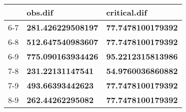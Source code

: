 \begin{table}[ht]
\centering
\begin{tabular}{rll}
  \hline
 & obs.dif & critical.dif \\ 
  \hline
6-7 & \textbf{281.426229508197} & \textbf{77.7478100179392} \\ 
  6-8 & \textbf{512.647540983607} & \textbf{77.7478100179392} \\ 
  6-9 & \textbf{775.090163934426} & \textbf{95.2212315813986} \\ 
  7-8 & \textbf{231.22131147541} & \textbf{54.9760036860882} \\ 
  7-9 & \textbf{493.66393442623} & \textbf{77.7478100179392} \\ 
  8-9 & \textbf{262.44262295082} & \textbf{77.7478100179392} \\ 
   \hline
\end{tabular}
\end{table}

